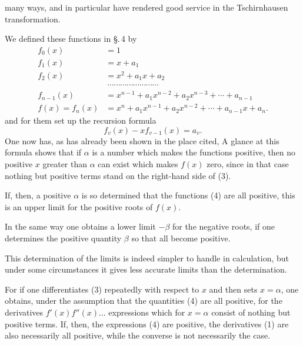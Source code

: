 many ways, and in particular have rendered good service in the
Tschirnhausen transformation.

We defined these functions in \S.\,4 by
\[
\begin{aligned}
f_0(x) &= 1\\
f_1(x) &= x+a_1\\
f_2(x) &= x^2+a_1x+a_2\\
&\ \cdots\cdots\cdots\cdots\cdots\cdots\cdots\cdots\\
f_{n-1}(x) &= x^{n-1}+a_1x^{n-2}+a_2x^{n-3}+\cdots+a_{n-1}\\
f(x)=f_n(x) &= x^n+a_1x^{n-1}+a_2x^{n-2}+\cdots+a_{n-1}x+a_n.
\end{aligned}
\]
and for them set up the recursion formula
\[
f_v(x)-xf_{v-1}(x)=a_v.
\]
One now has, as has already been shown in the place cited,
A glance at this formula shows that if $\alpha$ is a number which makes
the functions
positive, then no positive $x$ greater than $\alpha$ can exist which
makes $f(x)$ zero, since in that case nothing but positive terms stand
on the right-hand side of (3).

If, then, a positive $\alpha$ is so determined that the functions
(4) are all positive, this is an upper limit for the positive
roots of $f(x)$.

In the same way one obtains a lower limit $-\beta$ for the negative roots,
if one determines the positive quantity $\beta$ so that
all become positive.

This determination of the limits is indeed simpler to handle in
calculation, but under some circumstances it gives less accurate limits than
the  determination.

For if one differentiates (3) repeatedly with respect to $x$ and then
sets $x=\alpha$, one obtains, under the assumption that the
quantities (4) are all positive, for the derivatives $f'(x)f''(x)\ldots$
expressions which for $x=\alpha$ consist of nothing but positive terms.
If, then, the expressions (4) are positive, the derivatives (1) are
also necessarily all positive, while the converse is not
necessarily the case.
